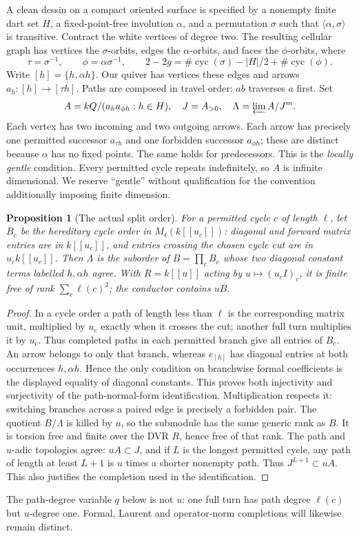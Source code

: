 \documentclass[11pt]{article}
\newtheorem{proposition}[theorem]{Proposition}
\theoremstyle{definition}\newtheorem{definition}[theorem]{Definition}
\theoremstyle{remark}\newtheorem{remark}[theorem]{Remark}
\begin{document}
A clean dessin on a compact oriented surface is specified by a nonempty finite dart set $H$, a fixed-point-free involution $\alpha$, and a permutation $\sigma$ such that $\langle\alpha,\sigma\rangle$ is transitive. Contract the white vertices of degree two. The resulting cellular graph has vertices the $\sigma$-orbits, edges the $\alpha$-orbits, and faces the $\phi$-orbits, where
\[
 \tau=\sigma^{-1},\qquad \phi=\alpha\sigma^{-1},\qquad
 2-2g=\#\operatorname{cyc}(\sigma)-|H|/2+\#\operatorname{cyc}(\phi).
\]
Write $[h]=\{h,\alpha h\}$. Our quiver has vertices these edges and arrows $a_h:[h]\to[\tau h]$. Paths are composed in travel order: $ab$ traverses $a$ first. Set
\[
 A=kQ/(a_h a_{\phi h}:h\in H),\quad J=A_{>0},\quad
 \Lambda=\varprojlim A/J^m.
\]
Each vertex has two incoming and two outgoing arrows. Each arrow has precisely one permitted successor $a_{\tau h}$ and one forbidden successor $a_{\phi h}$; these are distinct because $\alpha$ has no fixed points. The same holds for predecessors. This is the \emph{locally gentle} condition. Every permitted cycle repeats indefinitely, so $A$ is infinite dimensional. We reserve ``gentle'' without qualification for the convention additionally imposing finite dimension.

\begin{proposition}[The actual split order]\label{thm:order}
For a permitted cycle $c$ of length $\ell$, let $B_c$ be the hereditary cycle order in $M_\ell(k[[u_c]])$: diagonal and forward matrix entries are in $k[[u_c]]$, and entries crossing the chosen cycle cut are in $u_c k[[u_c]]$. Then $\Lambda$ is the suborder of $B=\prod_c B_c$ whose two diagonal constant terms labelled $h,\alpha h$ agree. With $R=k[[u]]$ acting by $u\mapsto(u_c I)_c$, it is finite free of rank $\sum_c\ell(c)^2$; the conductor contains $uB$.
\end{proposition}
\begin{proof}
In a cycle order a path of length less than $\ell$ is the corresponding matrix unit, multiplied by $u_c$ exactly when it crosses the cut; another full turn multiplies it by $u_c$. Thus completed paths in each permitted branch give all entries of $B_c$. An arrow belongs to only that branch, whereas $e_{[h]}$ has diagonal entries at both occurrences $h,\alpha h$. Hence the only condition on branchwise formal coefficients is the displayed equality of diagonal constants. This proves both injectivity and surjectivity of the path-normal-form identification. Multiplication respects it: switching branches across a paired edge is precisely a forbidden pair. The quotient $B/\Lambda$ is killed by $u$, so the submodule has the same generic rank as $B$. It is torsion free and finite over the DVR $R$, hence free of that rank. The path and $u$-adic topologies agree: $uA\subset J$, and if $L$ is the longest permitted cycle, any path of length at least $L+1$ is $u$ times a shorter nonempty path. Thus $J^{L+1}\subset uA$. This also justifies the completion used in the identification.
\end{proof}
The path-degree variable $q$ below is not $u$: one full turn has path degree $\ell(c)$ but $u$-degree one. Formal, Laurent and operator-norm completions will likewise remain distinct.
\end{document}
